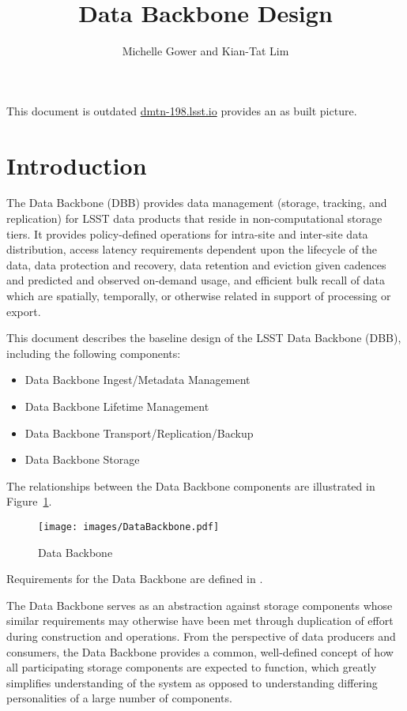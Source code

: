\documentclass[DM,obolete,authoryear,toc]{lsstdoc}
\title{Data Backbone Design}
\author{%
Michelle Gower and
Kian-Tat Lim
}
\date{\vcsDate}
\begin{document}
\maketitle


{\color{red} This document is outdated \url{dmtn-198.lsst.io} provides an as built picture. }
\section{Introduction}\label{introduction}

The Data Backbone (DBB) provides data management (storage, tracking, and
replication) for LSST data products that reside in non-computational storage
tiers.  It provides policy-defined operations for intra-site and inter-site
data distribution, access latency requirements dependent upon the lifecycle of
the data, data protection and recovery, data retention and eviction given
cadences and predicted and observed on-demand usage, and efficient bulk recall
of data which are spatially, temporally, or otherwise related in support of
processing or export.

This document describes the baseline design of the LSST Data Backbone (DBB),
including the following components:

\begin{itemize}
	\item Data Backbone Ingest/Metadata Management
	\item Data Backbone Lifetime Management
	\item Data Backbone Transport/Replication/Backup
	\item Data Backbone Storage
\end{itemize}

The relationships between the Data Backbone components are illustrated
in Figure~\ref{fig:dbb}.

\begin{figure}
\centering
\texttt{[image: images/DataBackbone.pdf]}
\caption{Data Backbone}
\label{fig:dbb}
\end{figure}

Requirements for the Data Backbone are defined in .

The Data Backbone serves as an abstraction against storage components whose
similar requirements may otherwise have been met through duplication of effort
during construction and operations. From the perspective of data producers and
consumers, the Data Backbone provides a common, well-defined concept of how all
participating storage components are expected to function, which greatly
simplifies understanding of the system as opposed to understanding differing
personalities of a large number of components.
\end{document}
